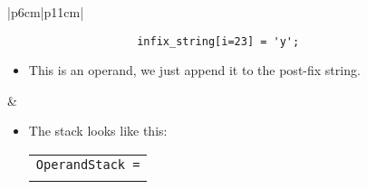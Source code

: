 \begin{center}
\begin{longtable}{ |p{6cm}|p{11cm}| }
         \\
        \hline 
        \hline
        
            {
                \begin{verbatim}
                    infix_string[i=23] = 'y';
                \end{verbatim}
            }
            \begin{itemize}
                \item This is an operand, we just append it to the post-fix string.
            \end{itemize}
            &
            \begin{itemize}
                \item The stack looks like this: 
                    {
                        \begin{center}
                            \begin{tabular}{ c }
                                \texttt{OperandStack =} \\ \\
                            \end{tabular}
                            \begin{bytefield}{10}
                                 \\
                            \end{bytefield}
                        \end{center}
                    }
                

\end{itemize}
\end{longtable}
\end{center}
